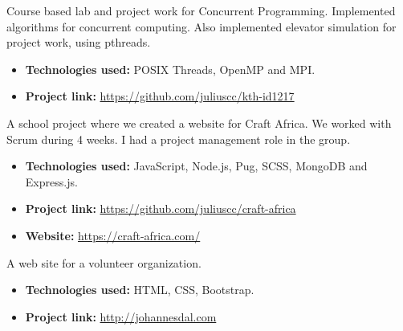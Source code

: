 \divider


Course based lab and project work for Concurrent Programming. Implemented algorithms for concurrent computing. Also implemented elevator simulation for project work, using pthreads.

\vspace{6pt}

\begin{itemize}
    \item \textbf{Technologies used:} POSIX Threads, OpenMP and MPI.
    \item \textbf{Project link:} \href{https://github.com/juliuscc/kth-id1217}{https://github.com/juliuscc/kth-id1217}
\end{itemize}

\divider


A school project where we created a website for Craft Africa. We worked with Scrum during 4 weeks. I had a project management role in the group.

\vspace{6pt}

\begin{itemize}
    \item \textbf{Technologies used:} JavaScript, Node.js, Pug, SCSS, MongoDB and Express.js.
    \item \textbf{Project link:} \href{https://github.com/juliuscc/craft-africa}{https://github.com/juliuscc/craft-africa}
    \item \textbf{Website:} \href{https://craft-africa.com/}{https://craft-africa.com/}
\end{itemize}

\divider

A web site for a volunteer organization.

\vspace{6pt}

\begin{itemize}
    \item \textbf{Technologies used:} HTML, CSS, Bootstrap.
    \item \textbf{Project link:} \href{http://johannesdal.com}{http://johannesdal.com}
\end{itemize}
